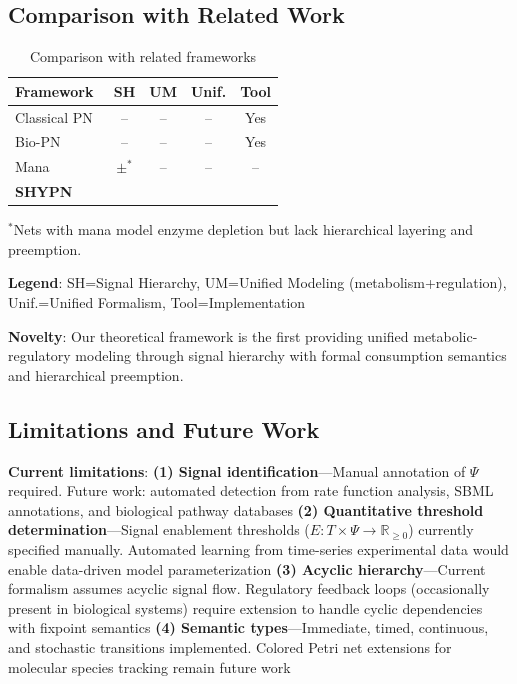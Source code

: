 \documentclass[twocolumn,11pt]{article}
\newcommand{\cmark}{\ding{51}}  %
\begin{document}
\subsection{Comparison with Related Work}

\begin{table}[h]
\caption{Comparison with related frameworks}
\centering
\small
\begin{tabular}{@{}lcccc@{}}
\toprule
\textbf{Framework} & \textbf{SH} & \textbf{UM} & \textbf{Unif.} & \textbf{Tool} \\
\midrule
Classical PN~\cite{murata1989} & -- & -- & -- & Yes \\
Bio-PN~\cite{heiner2008} & -- & -- & -- & Yes \\

Mana~\cite{genovese2021} & $\pm$$^*$ & -- & -- & -- \\
\textbf{SHYPN} & \cmark & \cmark & \cmark & \cmark \\
\bottomrule
\end{tabular}
\end{table}

\vspace{3pt}
\noindent$^*$Nets with mana model enzyme depletion but lack hierarchical layering and preemption.

\vspace{3pt}
\noindent\textbf{Legend}: SH=Signal Hierarchy, UM=Unified Modeling (metabolism+regulation), Unif.=Unified Formalism, Tool=Implementation

\vspace{3pt}
\noindent\textbf{Novelty}: Our theoretical framework is the first providing unified metabolic-regulatory modeling through signal hierarchy with formal consumption semantics and hierarchical preemption.

\subsection{Limitations and Future Work}

\vspace{3pt}
\noindent\textbf{Current limitations}: \textbf{(1) Signal identification}---Manual annotation of $\Psi$ required. Future work: automated detection from rate function analysis, SBML annotations, and biological pathway databases \textbf{(2) Quantitative threshold determination}---Signal enablement thresholds ($E: T \times \Psi \to \mathbb{R}_{\geq 0}$) currently specified manually. Automated learning from time-series experimental data would enable data-driven model parameterization \textbf{(3) Acyclic hierarchy}---Current formalism assumes acyclic signal flow. Regulatory feedback loops (occasionally present in biological systems) require extension to handle cyclic dependencies with fixpoint semantics \textbf{(4) Semantic types}---Immediate, timed, continuous, and stochastic transitions implemented. Colored Petri net extensions for molecular species tracking remain future work
\end{document}
